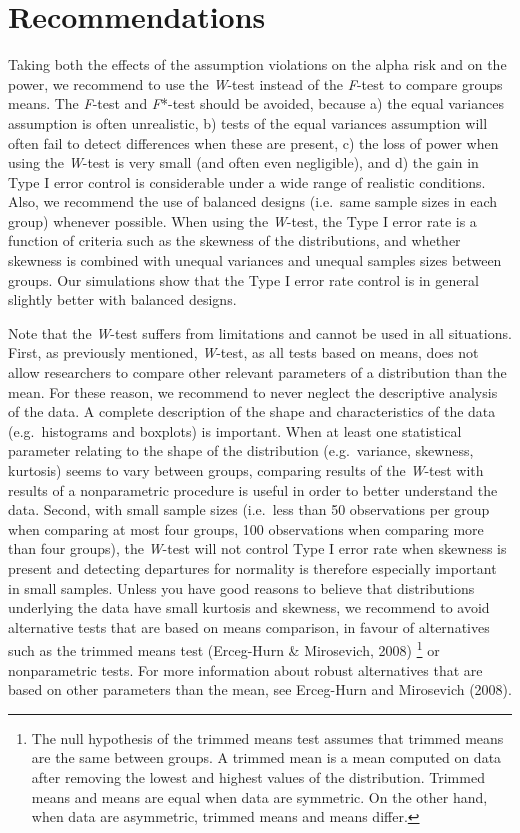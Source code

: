 \documentclass[man,floatsintext]{apa6}
\let\rmarkdownfootnote\footnote%
\def\footnote{\protect\rmarkdownfootnote}
\begin{document}
\hypertarget{recommendations}{%
\section{Recommendations}\label{recommendations}}

Taking both the effects of the assumption violations on the alpha risk and on the power, we recommend to use the \emph{W}-test instead of the \emph{F}-test to compare groups means. The \emph{F}-test and \emph{F}*-test should be avoided, because a) the equal variances assumption is often unrealistic, b) tests of the equal variances assumption will often fail to detect differences when these are present, c) the loss of power when using the \emph{W}-test is very small (and often even negligible), and d) the gain in Type I error control is considerable under a wide range of realistic conditions. Also, we recommend the use of balanced designs (i.e.~same sample sizes in each group) whenever possible. When using the \emph{W}-test, the Type I error rate is a function of criteria such as the skewness of the distributions, and whether skewness is combined with unequal variances and unequal samples sizes between groups. Our simulations show that the Type I error rate control is in general slightly better with balanced designs.

Note that the \emph{W}-test suffers from limitations and cannot be used in all situations. First, as previously mentioned, \emph{W}-test, as all tests based on means, does not allow researchers to compare other relevant parameters of a distribution than the mean. For these reason, we recommend to never neglect the descriptive analysis of the data. A complete description of the shape and characteristics of the data (e.g.~histograms and boxplots) is important. When at least one statistical parameter relating to the shape of the distribution (e.g.~variance, skewness, kurtosis) seems to vary between groups, comparing results of the \emph{W}-test with results of a nonparametric procedure is useful in order to better understand the data. Second, with small sample sizes (i.e.~less than 50 observations per group when comparing at most four groups, 100 observations when comparing more than four groups), the \emph{W}-test will not control Type I error rate when skewness is present and detecting departures for normality is therefore especially important in small samples. Unless you have good reasons to believe that distributions underlying the data have small kurtosis and skewness, we recommend to avoid alternative tests that are based on means comparison, in favour of alternatives such as the trimmed means test (Erceg-Hurn \& Mirosevich, 2008) \footnote{The null hypothesis of the trimmed means test assumes that trimmed means are the same between groups. A trimmed mean is a mean computed on data after removing the lowest and highest values of the distribution. Trimmed means and means are equal when data are symmetric. On the other hand, when data are asymmetric, trimmed means and means differ.} or nonparametric tests. For more information about robust alternatives that are based on other parameters than the mean, see Erceg-Hurn and Mirosevich (2008).
\end{document}
